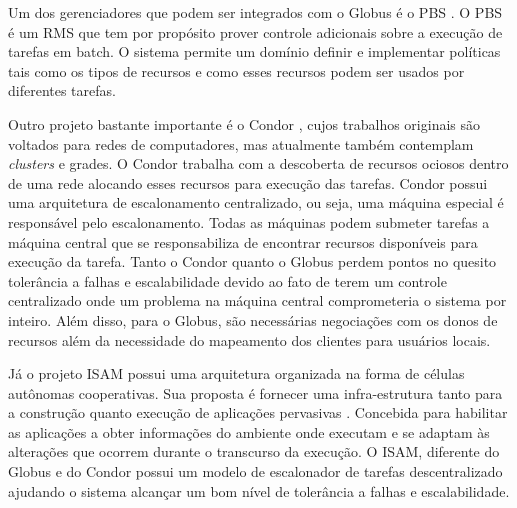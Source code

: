 Um dos gerenciadores que podem ser integrados com o Globus é o PBS \cite{Bayucan1998}. O PBS é um RMS que tem por propósito prover controle adicionais sobre a execução de tarefas em batch. O sistema permite um domínio definir e implementar políticas tais como os tipos de recursos e como esses recursos podem ser usados por diferentes tarefas.

Outro projeto bastante importante é o Condor \cite{condor2007}, cujos trabalhos originais são voltados para redes de computadores, mas atualmente também contemplam {\it clusters} e grades. O Condor trabalha com a descoberta de recursos ociosos dentro de uma rede alocando esses recursos para execução das tarefas. Condor possui uma arquitetura de escalonamento centralizado, ou seja, uma máquina especial é responsável pelo escalonamento. Todas as máquinas podem submeter tarefas a máquina central que se responsabiliza de encontrar recursos disponíveis para execução da tarefa. Tanto o Condor quanto o Globus perdem pontos no quesito tolerância a falhas e escalabilidade devido ao fato de terem um controle centralizado onde um problema na máquina central comprometeria o sistema por inteiro. Além disso, para o Globus, são necessárias negociações com os donos de recursos além da necessidade do mapeamento dos clientes para usuários locais.

Já o projeto ISAM \cite{isam} possui uma arquitetura organizada na forma de células autônomas cooperativas. Sua proposta é fornecer uma infra-estrutura tanto para a construção quanto execução de aplicações pervasivas \cite {isam}. Concebida para habilitar as aplicações a obter informações do ambiente onde executam e se adaptam às alterações que ocorrem durante o transcurso da execução. O ISAM, diferente do Globus e do Condor possui um modelo de escalonador de tarefas descentralizado ajudando o sistema alcançar um bom nível de tolerância a falhas e escalabilidade.
